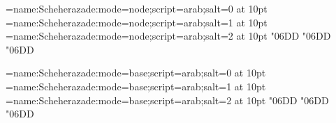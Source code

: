 
\font\0=name:Scheherazade:mode=node;script=arab;salt=0 at 10pt
\font\1=name:Scheherazade:mode=node;script=arab;salt=1 at 10pt
\font\2=name:Scheherazade:mode=node;script=arab;salt=2 at 10pt
\0 \char"06DD
\1 \char"06DD
\2 \char"06DD

\font\0=name:Scheherazade:mode=base;script=arab;salt=0 at 10pt
\font\1=name:Scheherazade:mode=base;script=arab;salt=1 at 10pt
\font\2=name:Scheherazade:mode=base;script=arab;salt=2 at 10pt
\0 \char"06DD
\1 \char"06DD
\2 \char"06DD
\bye
